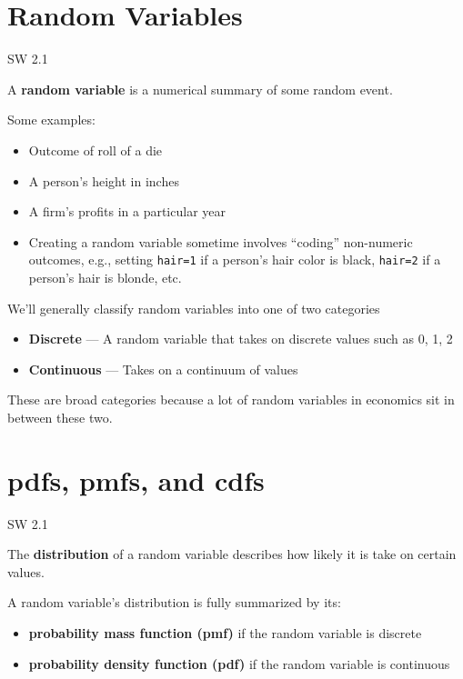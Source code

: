 \documentclass[
  letterpaper,
  DIV=11,
  numbers=noendperiod]{scrreprt}
\begin{document}
\section{Random Variables}\label{random-variables-1}

SW 2.1

A \textbf{random variable} is a numerical summary of some random event.

Some examples:

\begin{itemize}
\item
  Outcome of roll of a die
\item
  A person's height in inches
\item
  A firm's profits in a particular year
\item
  Creating a random variable sometime involves ``coding'' non-numeric
  outcomes, e.g., setting \texttt{hair=1} if a person's hair color is
  black, \texttt{hair=2} if a person's hair is blonde, etc.
\end{itemize}

We'll generally classify random variables into one of two categories

\begin{itemize}
\item
  \textbf{Discrete} --- A random variable that takes on discrete values
  such as 0, 1, 2
\item
  \textbf{Continuous} --- Takes on a continuum of values
\end{itemize}

These are broad categories because a lot of random variables in
economics sit in between these two.

\section{pdfs, pmfs, and cdfs}\label{pdfs-pmfs-and-cdfs}

SW 2.1

The \textbf{distribution} of a random variable describes how likely it
is take on certain values.

A random variable's distribution is fully summarized by its:

\begin{itemize}
\item
  \textbf{probability mass function (pmf)} if the random variable is
  discrete
\item
  \textbf{probability density function (pdf)} if the random variable is
  continuous
\end{itemize}
\end{document}
